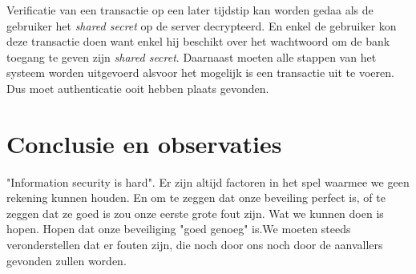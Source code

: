 \documentclass[11pt]{article}
\begin{document}
Verificatie van een transactie op een later tijdstip kan worden gedaa als de gebruiker het \emph{shared secret} op de server decrypteerd. En enkel de gebruiker kon deze transactie doen want enkel hij beschikt over het wachtwoord om de bank toegang te geven zijn \emph{shared secret}. Daarnaast moeten alle stappen van het systeem worden uitgevoerd alsvoor het mogelijk is een transactie uit te voeren. Dus moet authenticatie ooit hebben plaats gevonden.
\section{Conclusie en observaties}
"Information security is hard". Er zijn altijd factoren in het spel waarmee we geen rekening kunnen houden. En om te zeggen dat onze beveiling perfect is, of te zeggen dat ze goed is zou onze eerste grote fout zijn. Wat we kunnen doen is hopen. Hopen dat onze beveiliging "goed genoeg" is.We moeten steeds veronderstellen dat er fouten zijn, die noch door ons noch door de aanvallers gevonden zullen worden.
\end{document}
